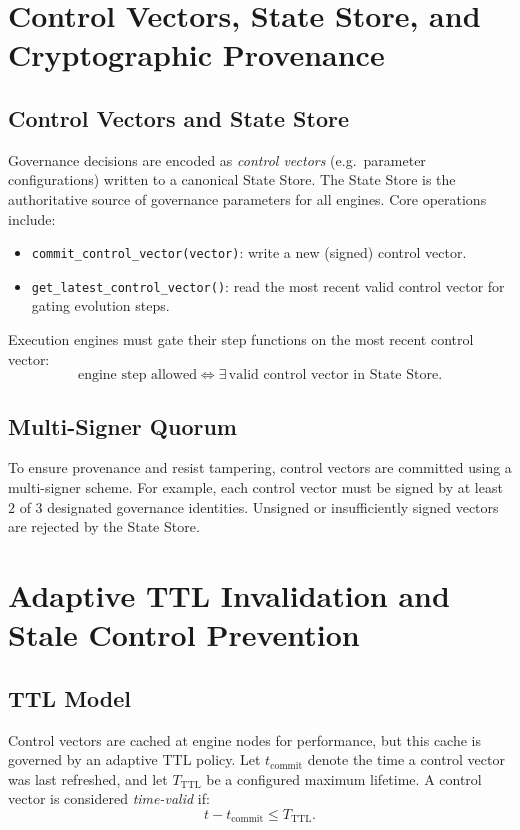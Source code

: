 \documentclass[11pt]{article}
\begin{document}
\section{Control Vectors, State Store, and Cryptographic Provenance}

\subsection{Control Vectors and State Store}

Governance decisions are encoded as \emph{control vectors} (e.g.\ parameter configurations) written to a canonical State Store.
The State Store is the authoritative source of governance parameters for all engines.
Core operations include:
\begin{itemize}[noitemsep]
  \item \texttt{commit\_control\_vector(vector)}: write a new (signed) control vector.
  \item \texttt{get\_latest\_control\_vector()}: read the most recent valid control vector for gating evolution steps.
\end{itemize}

Execution engines must gate their step functions on the most recent control vector:
\begin{equation}
  \text{engine step allowed} \iff \exists\,\text{valid control vector in State Store}.
\end{equation}

\subsection{Multi-Signer Quorum}

To ensure provenance and resist tampering, control vectors are committed using a multi-signer scheme.
For example, each control vector must be signed by at least $2$ of $3$ designated governance identities.
Unsigned or insufficiently signed vectors are rejected by the State Store.

\section{Adaptive TTL Invalidation and Stale Control Prevention}

\subsection{TTL Model}

Control vectors are cached at engine nodes for performance, but this cache is governed by an adaptive TTL policy.
Let $t_{\mathrm{commit}}$ denote the time a control vector was last refreshed, and let $T_{\mathrm{TTL}}$ be a configured maximum lifetime.
A control vector is considered \emph{time-valid} if:
\begin{equation}
  t - t_{\mathrm{commit}} \le T_{\mathrm{TTL}}.
\end{equation}
\end{document}
